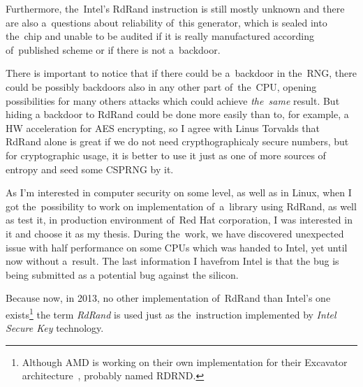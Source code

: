 Furthermore, the~Intel's RdRand instruction is still mostly unknown and there are also a~questions about reliability of~this generator, which is sealed into the~chip and unable to be audited\cite{TheodoreTsoNSA} if it is really manufactured according of~published scheme\cite{AnalysisOfDRNG} or if there is not a~backdoor. 

There is important to notice that if there could be a~backdoor in the~RNG, there could be possibly backdoors also in any other part of~the~CPU, opening possibilities for many others attacks which could achieve {\em the~same} result. But hiding a backdoor to RdRand could be done more easily than to, for example, a HW acceleration for AES encrypting, so I agree with Linus Torvalds that RdRand alone is great if we do not need crypthographicaly secure numbers, but for cryptographic usage, it is better to use it just as one of more sources of entropy and seed some CSPRNG by it.

As I'm interested in computer security on some level, as well as in Linux, 
when I got the~possibility to work on implementation of~a~library using RdRand, 
as well as test it, in production environment of~Red Hat corporation, 
I was interested in it and choose it as my thesis. 
During the~work, we have discovered unexpected issue with half performance 
on some CPUs which was handed to Intel, yet until now without a~result. The last information I havefrom Intel is that the bug is being submitted as a potential bug against the silicon.

Because now, in 2013, no other implementation of~RdRand than Intel's one exists\footnote{Although AMD is working on their own implementation for their Excavator architecture~\cite{AMDRdRand}, probably named RDRND.}
the term {\em RdRand} is used just as the~instruction implemented by {\em Intel Secure Key} technology.




